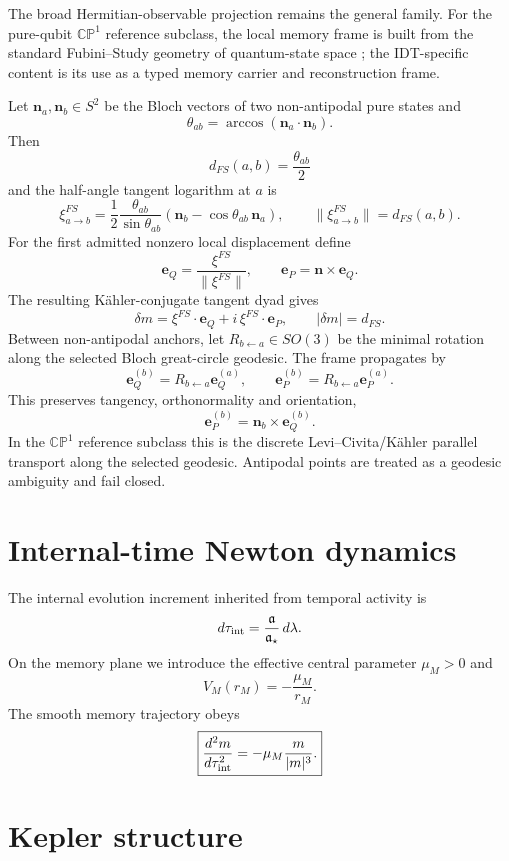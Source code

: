\documentclass[11pt]{book}
\begin{document}
The broad Hermitian-observable projection remains the general family. For the pure-qubit \(\mathbb{CP}^1\) reference subclass, the local memory frame is built from the standard Fubini--Study geometry of quantum-state space \cite{ProvostVallee1980}; the IDT-specific content is its use as a typed memory carrier and reconstruction frame.

Let \(\mathbf n_a,\mathbf n_b\in S^2\) be the Bloch vectors of two non-antipodal pure states and
\[
\theta_{ab}=\arccos(\mathbf n_a\cdot\mathbf n_b).
\]
Then
\[
d_{FS}(a,b)=\frac{\theta_{ab}}{2}
\]
and the half-angle tangent logarithm at \(a\) is
\[
\boxed{
\xi^{FS}_{a\to b}
=\frac12\frac{\theta_{ab}}{\sin\theta_{ab}}
\left(\mathbf n_b-\cos\theta_{ab}\,\mathbf n_a\right),
\qquad
\|\xi^{FS}_{a\to b}\|=d_{FS}(a,b).
}
\]
For the first admitted nonzero local displacement define
\[
\mathbf e_Q=\frac{\xi^{FS}}{\|\xi^{FS}\|},
\qquad
\boxed{\mathbf e_P=\mathbf n\times\mathbf e_Q}.
\]
The resulting K\"ahler-conjugate tangent dyad gives
\[
\boxed{
\delta m
=\xi^{FS}\cdot\mathbf e_Q
+i\,\xi^{FS}\cdot\mathbf e_P,
\qquad
|\delta m|=d_{FS}.
}
\]
Between non-antipodal anchors, let \(R_{b\leftarrow a}\in SO(3)\) be the minimal rotation along the selected Bloch great-circle geodesic. The frame propagates by
\[
\boxed{
\mathbf e_Q^{(b)}=R_{b\leftarrow a}\mathbf e_Q^{(a)},
\qquad
\mathbf e_P^{(b)}=R_{b\leftarrow a}\mathbf e_P^{(a)}.
}
\]
This preserves tangency, orthonormality and orientation,
\[
\mathbf e_P^{(b)}=\mathbf n_b\times\mathbf e_Q^{(b)}.
\]
In the \(\mathbb{CP}^1\) reference subclass this is the discrete Levi--Civita/K\"ahler parallel transport along the selected geodesic. Antipodal points are treated as a geodesic ambiguity and fail closed.

\section{Internal-time Newton dynamics}

The internal evolution increment inherited from temporal activity is
\[
d\tau_{\rm int}=\frac{\mathfrak a}{\mathfrak a_\star}\,d\lambda.
\]
On the memory plane we introduce the effective central parameter \(\mu_M>0\) and
\[
V_M(r_M)=-\frac{\mu_M}{r_M}.
\]
The smooth memory trajectory obeys
\[
\boxed{
\frac{d^2m}{d\tau_{\rm int}^2}
=-\mu_M\frac{m}{|m|^3}.
}
\]

\section{Kepler structure}
\end{document}
